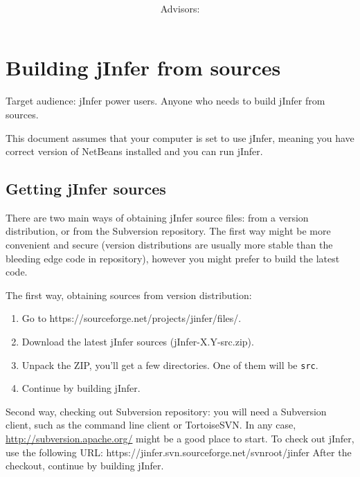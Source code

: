 \documentclass[a4paper,10pt,oneside]{article}
\title{\bf\mftitle}
\author{\mfauthor \\ Advisors: \mfadvisor}
\date{\mfplacedate}
\begin{document}
\maketitle




 
  
 



 \section*{Building jInfer from sources}
\par 
  Target audience: jInfer power users. Anyone who needs to build jInfer from sources.

\par 
  This document assumes that your computer is set to use jInfer, meaning you
    have correct version of NetBeans installed and you can run jInfer.

\subsection*{Getting jInfer sources}
\par 
There are two main ways of obtaining jInfer source files: from a version
  distribution, or from the Subversion repository. The first way might be more
  convenient and secure (version distributions are usually more stable than the
  bleeding edge code in repository), however you might prefer to build the
  latest code.

\par 
  The first way, obtaining sources from version distribution:

\begin{enumerate}\item 
 Go to 
https://sourceforge.net/projects/jinfer/files/.
  \item Download the latest jInfer sources (jInfer-X.Y-src.zip).
  \item Unpack the ZIP, you'll get a few directories. One of them will be \texttt{src}.
  \item Continue by building jInfer.
  \end{enumerate}
\par 
  Second way, checking out Subversion repository: you will need a
  Subversion client, such as the command line client or TortoiseSVN. In any case,
  \url{http://subversion.apache.org/}
might be a good place to start. To check out
  jInfer, use the following URL:
  https://jinfer.svn.sourceforge.net/svnroot/jinfer
  After the checkout, continue by building jInfer.
\end{document}
